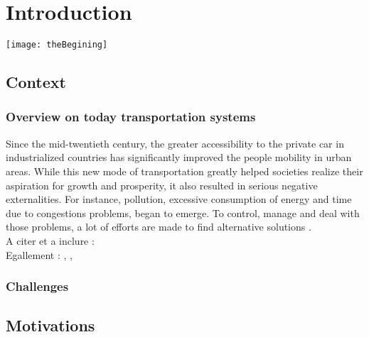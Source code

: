 \chapter{Introduction} \label{chap:introduction}
\begin{bibunit}[ieeetr]
\minitoc
\vspace{2cm}
%
\noindent
\begin{minipage}[c]{0.45\textwidth}
\texttt{[image: theBegining]}
\end{minipage}
\hfill
\begin{minipage}[c]{0.45\textwidth}
\begin{abstract}
\end{abstract}
\end{minipage}

\newpage
\section{Context}
\subsection{Overview on today transportation systems}
Since the mid-twentieth century, the greater accessibility to the private car in industrialized countries has significantly improved the people mobility in urban areas. 
While this new mode of transportation greatly helped societies realize their aspiration for growth and prosperity, it also resulted in serious negative externalities.
For instance, pollution, excessive consumption of energy and time due to congestions problems, began to emerge.
To control, manage and deal with those problems, a lot of efforts are made to find alternative solutions \cite{mitchell_reinventing_2010}.\\

A citer et a inclure : \cite{le_vine_carsharing_2014}\\
Egallement : \cite{v-traffic_letat_2014}, \cite{la_mobilite_2008}, 

\subsection{Challenges}

\section{Motivations}

\end{bibunit}
